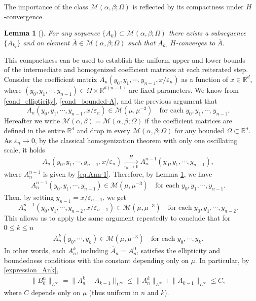 \documentclass[reqno,12pt]{amsart} %
\newtheorem{lemma}[theorem]{Lemma}
\theoremstyle{definition}
\theoremstyle{remark}
\numberwithin{equation}{section}
\newcommand{\R}{\mathbb{R}}
\newcommand{\e}{\varepsilon}
\newcommand{\jz}[1]{\textcolor{red}{#1}}
\begin{document}
The importance of the class $\mathcal{M}(\alpha,\beta;\Omega)$ is reflected by its compactness under $H$-convergence.
\begin{lemma}[{\cite[Theorem 6.5]{T09}}]\label{case-n=1_lem_Hcompact}
  For any sequence $\{A_k\}\subset \mathcal{M}(\alpha, \beta; \Omega)$ there exists a subsequence $\{A_{k_\ell}\}$ and an element $\bar{A}\in \mathcal{M}(\alpha, \beta; \Omega)$ such that $A_{k_\ell}$ $H$-converges to $\bar{A}$. 
\end{lemma}
This compactness can be used to establish the uniform upper and lower bounds of the intermediate and homogenized coefficient matrices at each reiterated step. 
Consider the coefficient matrix $A_n(y_0, y_1,\cdots, y_{n-1}, x/\e_n)$ as a function of $x \in \R^d$, where $(y_0, y_1, \cdots, y_{n-1})\in \Omega\times \mathbb{R}^{d(n-1)}$ are fixed parameters. We know from \eqref{cond_ellipticity}, \eqref{cond_bounded-A}, and the previous argument that 
$$
A_n(y_0, y_1, \cdots, y_{n-1}, x/\varepsilon_n)\in \mathcal{M}(\mu, \mu^{-3}) \quad \text{for each }y_0, y_1, \cdots, y_{n-1}.
$$
Hereafter we write $\mathcal{M}(\alpha, \beta) = \mathcal{M}(\alpha, \beta; \Omega)$ if the coefficient matrices are defined in the entire $\R^d$ and drop in every $\mathcal{M}(\alpha, \beta; \Omega)$ for any bounded $\Omega \subset \R^d$. As $\e_n \to 0$, by the classical homogenization theorem with only one oscillating scale, it holds
\[
A_n(y_0, y_1, \cdots, y_{n-1}, x/\e_n) \xrightarrow[\e_n\to 0]{H} A_n^{n-1}(y_0, y_1, \cdots, y_{n-1}),
\]
where $A_n^{n-1}$ is given by \eqref{eq.Ann-1}.
Therefore, by Lemma \ref{case-n=1_lem_Hcompact}, we have
\begin{align*}
  A_n^{n-1}(y_0, y_1, \cdots, y_{n-1})\in \mathcal{M}(\mu, \mu^{-3})\quad\text{for each } y_0, y_1, \cdots, y_{n-1}.
\end{align*}
Then, by setting $y_{n-1}=x/\varepsilon_{n-1}$, we get $$A_n^{n-1}(y_0, y_1, \cdots, y_{n-2}, x/ \varepsilon_{n-1})\in \mathcal{M}(\mu, \mu^{-3})\quad \text{for each }y_0, y_1, \cdots, y_{n-2}. $$
This allows us to apply the same argument repeatedly to conclude that for $0\leq k\leq n$
\begin{align}\label{es_Ank_bound}
  A_n^k(y_0, \cdots, y_k)\in \mathcal{M}(\mu, \mu^{-3}) \quad \text{for each }y_0, \cdots, y_k. 
\end{align}
In other words, each $A_n^k$, including $\widehat{A}_n=A_n^0$, satisfies the ellipticity and boundedness conditions with the constant depending only on $\mu$. 
 In particular, by \eqref{expression_Ank},
 \begin{align}
   \label{es_Bkn_bound}
 \|B_k^n\|_{L^\infty} = \|A^k_n - A_{k-1}\|_{L^\infty} \le \|A^k_n \|_{L^\infty} + \|A_{k-1}\|_{L^\infty} \leq C, 
 \end{align}
where $C$ depends only on $\mu$ (thus uniform in $n$ and $k$).
\end{document}
